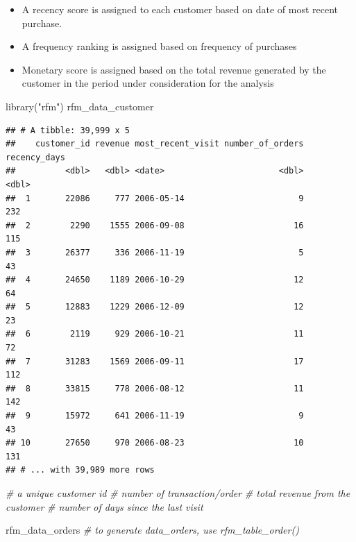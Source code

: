 \documentclass[
]{book}
\newenvironment{Shaded}{\begin{snugshade}}{\end{snugshade}}
\newcommand{\CommentTok}[1]{\textcolor[rgb]{0.56,0.35,0.01}{\textit{#1}}}
\newcommand{\FunctionTok}[1]{\textcolor[rgb]{0.00,0.00,0.00}{#1}}
\newcommand{\NormalTok}[1]{#1}
\newcommand{\StringTok}[1]{\textcolor[rgb]{0.31,0.60,0.02}{#1}}
\providecommand{\tightlist}{%
  \setlength{\itemsep}{0pt}\setlength{\parskip}{0pt}}
\begin{document}
\begin{itemize}
\tightlist
\item
  A recency score is assigned to each customer based on date of most recent purchase.
\item
  A frequency ranking is assigned based on frequency of purchases
\item
  Monetary score is assigned based on the total revenue generated by the customer in the period under consideration
  for the analysis
\end{itemize}

\begin{Shaded}
\begin{Highlighting}[]
\FunctionTok{library}\NormalTok{(}\StringTok{"rfm"}\NormalTok{)}
\NormalTok{rfm\_data\_customer}
\end{Highlighting}
\end{Shaded}

\begin{verbatim}
## # A tibble: 39,999 x 5
##    customer_id revenue most_recent_visit number_of_orders recency_days
##          <dbl>   <dbl> <date>                       <dbl>        <dbl>
##  1       22086     777 2006-05-14                       9          232
##  2        2290    1555 2006-09-08                      16          115
##  3       26377     336 2006-11-19                       5           43
##  4       24650    1189 2006-10-29                      12           64
##  5       12883    1229 2006-12-09                      12           23
##  6        2119     929 2006-10-21                      11           72
##  7       31283    1569 2006-09-11                      17          112
##  8       33815     778 2006-08-12                      11          142
##  9       15972     641 2006-11-19                       9           43
## 10       27650     970 2006-08-23                      10          131
## # ... with 39,989 more rows
\end{verbatim}

\begin{Shaded}
\begin{Highlighting}[]
\CommentTok{\# a unique customer id}
\CommentTok{\# number of transaction/order}
\CommentTok{\# total revenue from the customer}
\CommentTok{\# number of days since the last visit}


\NormalTok{rfm\_data\_orders }\CommentTok{\# to generate data\_orders, use rfm\_table\_order()}
\end{Highlighting}
\end{Shaded}
\end{document}
